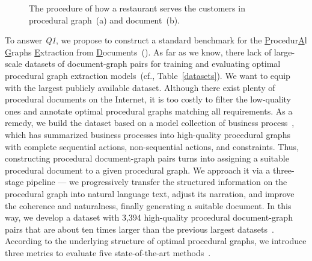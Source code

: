 \begin{figure}[t]
    \centering
    \vspace{-5pt}


    \caption{The procedure of how a restaurant serves the customers in procedural graph~(a) and document~(b).}
    \label{fig:task}

\end{figure}

To answer \textit{Q1}, we propose to construct a standard benchmark for the \underline{P}rocedur\underline{A}l \underline{G}raphs \underline{E}xtraction from \underline{D}ocuments~(\benchmark). As far as we know, there lack of large-scale datasets of document-graph pairs for training and evaluating optimal procedural graph extraction models~(cf., Table~\ref{datasets}). We want to equip \benchmark with the largest publicly available dataset. Although there exist plenty of procedural documents on the Internet, it is too costly to filter the low-quality ones and annotate optimal procedural graphs matching all requirements. As a remedy, we build the dataset based on a model collection of business process~\cite{dumas2018fundamentals}, which has summarized business processes into high-quality procedural graphs with complete sequential actions, non-sequential actions, and constraints. Thus, constructing procedural document-graph pairs turns into assigning a suitable procedural document to a given procedural graph. We approach it via a three-stage pipeline --- we progressively transfer the structured information on the procedural graph into natural language text, adjust its narration, and improve the coherence and naturalness, finally generating a suitable document. In this way, we develop a dataset with 3,394 high-quality procedural document-graph pairs that are about ten times larger than the previous largest datasets~\cite{ackermann2021data,qian2020approach}. According to the underlying structure of optimal procedural graphs, we introduce {three metrics} to evaluate five state-of-the-art methods~\cite{sonbol2023machine,neuberger2023beyond,sholiq2022generating}.

